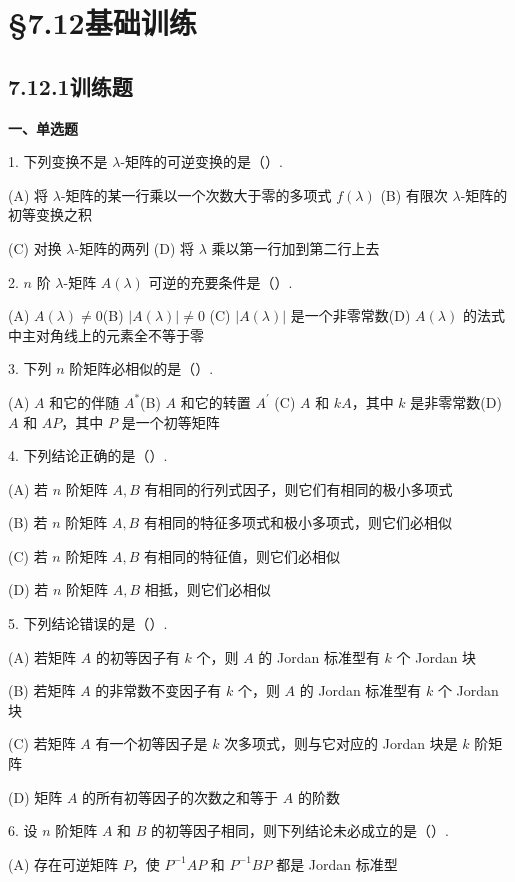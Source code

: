 \documentclass[UTF8,12pt,a4paper,fontset=fandol]{ctexart}
\begin{document}
\section*{§7.12\quad 基础训练}

\subsection*{7.12.1\quad 训练题}

\noindent\textbf{一、单选题}

1. 下列变换不是 $\lambda$-矩阵的可逆变换的是（\quad）.

(A) 将 $\lambda$-矩阵的某一行乘以一个次数大于零的多项式 $f(\lambda)$\quad
(B) 有限次 $\lambda$-矩阵的初等变换之积

(C) 对换 $\lambda$-矩阵的两列\quad
(D) 将 $\lambda$ 乘以第一行加到第二行上去

2. $n$ 阶 $\lambda$-矩阵 $A(\lambda)$ 可逆的充要条件是（\quad）.

(A) $A(\lambda)\ne0$\quad (B) $|A(\lambda)|\ne0$\quad
(C) $|A(\lambda)|$ 是一个非零常数\quad (D) $A(\lambda)$ 的法式中主对角线上的元素全不等于零

3. 下列 $n$ 阶矩阵必相似的是（\quad）.

(A) $A$ 和它的伴随 $A^*$\quad (B) $A$ 和它的转置 $A^{\prime}$\quad
(C) $A$ 和 $kA$，其中 $k$ 是非零常数\quad (D) $A$ 和 $AP$，其中 $P$ 是一个初等矩阵

4. 下列结论正确的是（\quad）.

(A) 若 $n$ 阶矩阵 $A,B$ 有相同的行列式因子，则它们有相同的极小多项式

(B) 若 $n$ 阶矩阵 $A,B$ 有相同的特征多项式和极小多项式，则它们必相似

(C) 若 $n$ 阶矩阵 $A,B$ 有相同的特征值，则它们必相似

(D) 若 $n$ 阶矩阵 $A,B$ 相抵，则它们必相似

5. 下列结论错误的是（\quad）.

(A) 若矩阵 $A$ 的初等因子有 $k$ 个，则 $A$ 的 Jordan 标准型有 $k$ 个 Jordan 块

(B) 若矩阵 $A$ 的非常数不变因子有 $k$ 个，则 $A$ 的 Jordan 标准型有 $k$ 个 Jordan 块

(C) 若矩阵 $A$ 有一个初等因子是 $k$ 次多项式，则与它对应的 Jordan 块是 $k$ 阶矩阵

(D) 矩阵 $A$ 的所有初等因子的次数之和等于 $A$ 的阶数

6. 设 $n$ 阶矩阵 $A$ 和 $B$ 的初等因子相同，则下列结论未必成立的是（\quad）.

(A) 存在可逆矩阵 $P$，使 $P^{-1}AP$ 和 $P^{-1}BP$ 都是 Jordan 标准型
\end{document}
